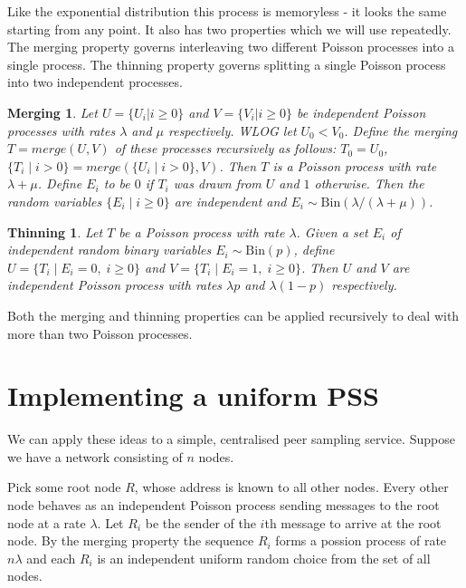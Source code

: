 \documentclass[a4paper,10pt]{article}
\begin{document}
Like the exponential distribution this process is memoryless - it looks the same starting from any point. It also has two properties which we will use repeatedly. The merging property governs interleaving two different Poisson processes into a single process. The thinning property governs splitting a single Poisson process into two independent processes.

\newtheorem*{merging}{Merging}
\begin{merging}
Let $U=\{U_i | i \geq 0\}$ and $V=\{V_i | i \geq 0\}$ be independent Poisson processes with rates $\lambda$ and $\mu$ respectively. WLOG let $U_0 < V_0$. Define the merging \;$T = merge(U,V)$\; of these processes recursively as follows: $T_0 = U_0$, $\{T_i \;|\; i>0\} = merge(\{U_i \;|\; i>0\}, V)$. Then $T$ is a Poisson process with rate $\lambda + \mu$. Define $E_i$ to be $0$ if $T_i$ was drawn from $U$ and $1$ otherwise. Then the random variables $\{E_i \;|\; i \geq 0\}$ are independent and $E_i \sim \text{Bin}(\lambda / (\lambda + \mu))$. 
\end{merging}
 
\newtheorem*{thinning}{Thinning}
\begin{thinning}
Let $T$ be a Poisson process with rate $\lambda$. Given a set $E_i$ of independent random binary variables $E_i \sim \text{Bin}(p)$, define $U = \{T_i \;|\; E_i = 0, \; i \geq 0\}$ and $V = \{T_i \;|\; E_i = 1, \; i \geq 0\}$. Then $U$ and $V$ are independent Poisson process with rates $\lambda p$ and $\lambda (1-p)$ respectively.
\end{thinning}

Both the merging and thinning properties can be applied recursively to deal with more than two Poisson processes.

\section{Implementing a uniform PSS}

We can apply these ideas to a simple, centralised peer sampling service. Suppose we have a network consisting of $n$ nodes.

Pick some root node $R$, whose address is known to all other nodes. Every other node behaves as an independent Poisson process sending messages to the root node at a rate $\lambda$. Let $R_i$ be the sender of the $i$th message to arrive at the root node. By the merging property the sequence $R_i$ forms a possion process of rate $n \lambda$ and each $R_i$ is an independent uniform random choice from the set of all nodes.
\end{document}
